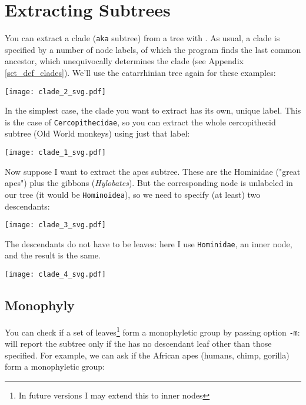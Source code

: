 

\section{Extracting Subtrees}
\label{sct_subtrees}

You can extract a clade (\texttt{aka} subtree) from a tree with \clade. As
usual, a clade is specified by a number of node labels, of which the program
finds the last common ancestor, which unequivocally determines the clade (see
Appendix \ref{sct_def_clades}).  We'll use the catarrhinian tree again for
these examples:


\begin{center}
\texttt{[image: clade\_2\_svg.pdf]}
\end{center}

In the simplest case, the clade you want to extract has its own, unique label.
This is the case of \texttt{Cercopithecidae}, so you can extract the whole
cercopithecid subtree (Old World monkeys) using just that label:


\begin{center}
  \texttt{[image: clade\_1\_svg.pdf]}
\end{center}

Now suppose I want to extract the apes subtree. These are the Hominidae
("great apes") plus the gibbons (\textit{Hylobates}). But the corresponding
node is unlabeled in our tree (it would be \texttt{Hominoidea}), so we need to specify (at least) two descendants:


\begin{center}
  \texttt{[image: clade\_3\_svg.pdf]}
\end{center}

\noindent{}The descendants do not have to be leaves: here I use \texttt{Hominidae}, an inner node, and the result is the same.


\begin{center}
  \texttt{[image: clade\_4\_svg.pdf]}
\end{center}

\subsection{Monophyly}

You can check if a set of leaves\footnote{In future versions I may extend this
to inner nodes} form a monophyletic group by passing option \texttt{-m}:
\clade{} will report the subtree only if the \lca{} has no descendant leaf
other than those specified.  For example, we can ask if the African apes
(humans, chimp, gorilla) form a monophyletic group:

